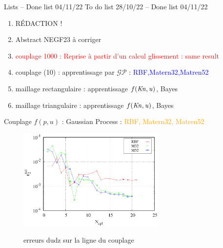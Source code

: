 \documentclass[aspect ratio=169,t]{beamer}
\newcommand\blue[1]{\textcolor{blue}{#1}} %
\newcommand\orange[1]{\textcolor{orange}{#1}} %
\numberwithin{equation}{section} %
\begin{document}
\begin{frame}{Lists -- Done list 04/11/22 }
{To do list 28/10/22  --  Done list 04/11/22}

\begin{enumerate}
    \item \textcolor{green!50!black}{R}ÉDACTION !
    \item Abstract NEGF23 à corriger
    \item \textcolor{red}{couplage 1000 : Reprise à partir d'un calcul glissement : same result}
    \item \textcolor{green!50!black}{couplage (10) : apprentissage par } $\mathcal{GP}$ : \blue{RBF,Matern32,Matren52}
    \item \textcolor{green!50!black}{maillage rectangulaire : apprentissage $f(\it{Kn},u)$}, Bayes
    \item \textcolor{green!50!black}{maillage triangulaire : apprentissage $f(\it{Kn},u)$}, Bayes
\end{enumerate}
\end{frame}
\begin{frame}{Couplage $f(p,u)$ : Gaussian Process : \orange{RBF, Matern32, Matren52}}
\begin{figure}[!ht]
     \centering
        {\includegraphics[width=0.65\textwidth]{figures/coupling/output_slip_err_gp_noslip_20.eps}}
     \caption{erreurs dudz sur la ligne du couplage}
    \label{fig:err_gp_case_fpu}
\end{figure}
\end{frame}
\end{document}
